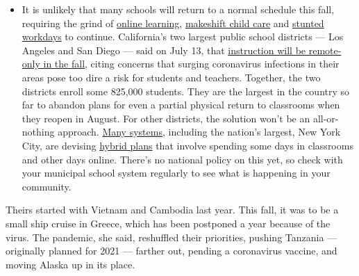 \begin{itemize}
  \begin{itemize}
  \tightlist
  \item
    It is unlikely that many schools will return to a normal schedule
    this fall, requiring the grind of
    \href{https://www.nytimes.com/2020/06/05/us/coronavirus-education-lost-learning.html?action=click\&pgtype=Article\&state=default\&region=MAIN_CONTENT_3\&context=storylines_faq}{online
    learning},
    \href{https://www.nytimes.com/2020/05/29/us/coronavirus-child-care-centers.html?action=click\&pgtype=Article\&state=default\&region=MAIN_CONTENT_3\&context=storylines_faq}{makeshift
    child care} and
    \href{https://www.nytimes.com/2020/06/03/business/economy/coronavirus-working-women.html?action=click\&pgtype=Article\&state=default\&region=MAIN_CONTENT_3\&context=storylines_faq}{stunted
    workdays} to continue. California's two largest public school
    districts --- Los Angeles and San Diego --- said on July 13, that
    \href{https://www.nytimes.com/2020/07/13/us/lausd-san-diego-school-reopening.html?action=click\&pgtype=Article\&state=default\&region=MAIN_CONTENT_3\&context=storylines_faq}{instruction
    will be remote-only in the fall}, citing concerns that surging
    coronavirus infections in their areas pose too dire a risk for
    students and teachers. Together, the two districts enroll some
    825,000 students. They are the largest in the country so far to
    abandon plans for even a partial physical return to classrooms when
    they reopen in August. For other districts, the solution won't be an
    all-or-nothing approach.
    \href{https://bioethics.jhu.edu/research-and-outreach/projects/eschool-initiative/school-policy-tracker/}{Many
    systems}, including the nation's largest, New York City, are
    devising
    \href{https://www.nytimes.com/2020/06/26/us/coronavirus-schools-reopen-fall.html?action=click\&pgtype=Article\&state=default\&region=MAIN_CONTENT_3\&context=storylines_faq}{hybrid
    plans} that involve spending some days in classrooms and other days
    online. There's no national policy on this yet, so check with your
    municipal school system regularly to see what is happening in your
    community.
  \end{itemize}
\end{itemize}

Theirs started with Vietnam and Cambodia last year. This fall, it was to
be a small ship cruise in Greece, which has been postponed a year
because of the virus. The pandemic, she said, reshuffled their
priorities, pushing Tanzania --- originally planned for 2021 --- farther
out, pending a coronavirus vaccine, and moving Alaska up in its place.


